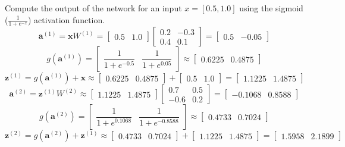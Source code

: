 \documentclass[12pt]{article}
\begin{document}
\begin{enumerate}[font=\Large]
	      Compute the output of the network for an input $x=[0.5,1.0]$ using the sigmoid ($\frac{1}{1+e^{-x}}$) activation function.
	      $$
		      \mathbf{a}^{(1)} = \mathbf{x} W^{(1)} = \begin{bmatrix} 0.5 & 1.0 \end{bmatrix} \begin{bmatrix} 0.2 & -0.3 \\ 0.4 & 0.1 \end{bmatrix} = \begin{bmatrix} 0.5 & -0.05 \end{bmatrix}
	      $$
	      $$
		      g(\mathbf{a}^{(1)}) = \begin{bmatrix} \dfrac{1}{1 + e^{-0.5}} & \dfrac{1}{1 + e^{0.05}} \end{bmatrix} \approx \begin{bmatrix} 0.6225 & 0.4875 \end{bmatrix}
	      $$
	      $$
		      \mathbf{z}^{(1)} = g(\mathbf{a}^{(1)}) + \mathbf{x} \approx \begin{bmatrix} 0.6225 & 0.4875 \end{bmatrix} + \begin{bmatrix} 0.5 & 1.0 \end{bmatrix} = \begin{bmatrix} 1.1225 & 1.4875 \end{bmatrix}
	      $$
	      $$
		      \mathbf{a}^{(2)} = \mathbf{z}^{(1)} W^{(2)} \approx \begin{bmatrix} 1.1225 & 1.4875 \end{bmatrix} \begin{bmatrix} 0.7 & 0.5 \\ -0.6 & 0.2 \end{bmatrix} = \begin{bmatrix} -0.1068 & 0.8588 \end{bmatrix}
	      $$
	      $$
		      g(\mathbf{a}^{(2)}) = \begin{bmatrix} \dfrac{1}{1 + e^{0.1068}} & \dfrac{1}{1 + e^{-0.8588}} \end{bmatrix} \approx \begin{bmatrix} 0.4733 & 0.7024 \end{bmatrix}
	      $$
	      $$
		      \mathbf{z}^{(2)} = g(\mathbf{a}^{(2)}) + \mathbf{z}^{(1)} \approx \begin{bmatrix} 0.4733 & 0.7024 \end{bmatrix} + \begin{bmatrix} 1.1225 & 1.4875 \end{bmatrix} = \begin{bmatrix} 1.5958 & 2.1899 \end{bmatrix}
	      $$


\end{enumerate}
\end{document}
